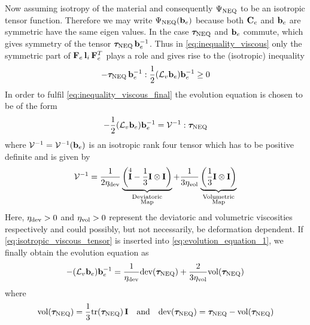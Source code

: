 Now assuming isotropy of the material and consequently \(\Psi_{\text{NEQ}}\) to be an isotropic tensor function. Therefore we may write \(\Psi_{\text{NEQ}}(\mathbf{b}_{e})\) because both \(\mathbf{C}_{e}\) and \(\mathbf{b}_{e}\) are symmetric have the same eigen values. In the case \(\bm{\tau}_{\text{NEQ}}\) and \(\mathbf{b}_{e}\) commute, which gives symmetry of the tensor \(\bm{\tau}_{\text{NEQ}} \, \mathbf{b}_{e}^{-1}\). Thus in \cref{eq:inequality_viscous} only the symmetric part of \( \mathbf{F}_{e} \, \mathbf{l}_{i} \, \mathbf{F}_{e}^{T} \) plays a role and gives rise to the (isotropic) inequality
\begin{equation}
    - \bm{\tau}_{\text{NEQ}}\,  \mathbf{b}_{e}^{-1} : \frac{1}{2} (\mathcal{L}_{v} \mathbf{b}_{e}) \mathbf{b}_{e}^{-1} \geq 0
    \label{eq:inequality_viscous_final}
\end{equation}
In order to fulfil \cref{eq:inequality_viscous_final} the evolution equation is chosen to be of the form
\begin{equation}
   -  \frac{1}{2} (\mathcal{L}_{v} \mathbf{b}_{e}) \mathbf{b}_{e}^{-1} = \mathcal{V}^{-1} : \bm{\tau}_{\text{NEQ}}
   \label{eq:evolution_equation_1}
\end{equation}
where \(\mathcal{V}^{-1} = \mathcal{V}^{-1}(\mathbf{b}_{e})\) is an isotropic rank four tensor which has to be positive definite and is given by
\begin{equation}
    \mathcal{V}^{-1} = \frac{1}{2\eta_{\text{dev}}}\underbrace{\left( \overset{4}{\mathbf{I}} - \frac{1}{3} \mathbf{I} \otimes \mathbf{I}\right)}_{\substack{\text{Deviatoric} \\ \text{Map}}} + \frac{1}{3\eta_{\text{vol}}} \underbrace{\left(  \frac{1}{3} \mathbf{I} \otimes \mathbf{I}\right)}_{\substack{\text{Volumetric} \\ \text{Map}}}
    \label{eq:isotropic_viscous_tensor}
\end{equation} 
Here, \(\eta_{\text{dev}} > 0\) and \(\eta_{\text{vol}} > 0\) represent the deviatoric and volumetric viscosities respectively and could possibly, but not necessarily, be deformation dependent.
If \cref{eq:isotropic_viscous_tensor} is inserted into \cref{eq:evolution_equation_1}, we finally obtain the evolution equation as
\begin{equation}
    -  (\mathcal{L}_{v} \mathbf{b}_{e}) \mathbf{b}_{e}^{-1} 
    =  \frac{1}{\eta_{\text{dev}}} \text{dev}(\bm{\tau}_{\text{NEQ}}) 
    + \frac{2}{3\eta_{\text{vol}}} \text{vol}(\bm{\tau}_{\text{NEQ}})
    \label{eq:evolution_equation_2}
\end{equation}
where 
\begin{equation}
    \text{vol}(\bm{\tau}_{\text{NEQ}}) = \frac{1}{3} \text{tr}(\bm{\tau}_{\text{NEQ}})\, \mathbf{I} \quad \text{and} \quad
    \text{dev}(\bm{\tau}_{\text{NEQ}}) = \bm{\tau}_{\text{NEQ}} - \text{vol}(\bm{\tau}_{\text{NEQ}})
\end{equation}


